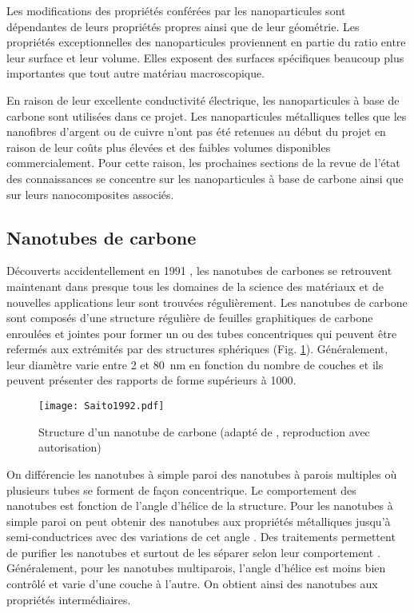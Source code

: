 Les modifications des propriétés conférées par les nanoparticules sont dépendantes de leurs propriétés propres ainsi que de leur géométrie. 
Les propriétés exceptionnelles des nanoparticules proviennent en partie du ratio entre leur surface et leur volume. 
Elles exposent des surfaces spécifiques beaucoup plus importantes que tout autre matériau macroscopique. 

En raison de leur excellente conductivité électrique, les nanoparticules à base de carbone sont utilisées dans ce projet. 
Les nanoparticules métalliques telles que les nanofibres d'argent ou de cuivre n'ont pas été retenues au début du projet en raison de leur coûts plus élevées et des faibles volumes disponibles commercialement. 
Pour cette raison, les prochaines sections de la revue de l'état des connaissances se concentre sur les nanoparticules à base de carbone ainsi que sur leurs nanocomposites associés. 

\subsection{Nanotubes de carbone}

Découverts accidentellement en 1991 \cite{iijima1991}, les nanotubes de carbones se retrouvent maintenant dans presque tous les domaines de la science des matériaux et de nouvelles applications leur sont trouvées régulièrement. 
Les nanotubes de carbone sont composés d'une structure régulière de feuilles graphitiques de carbone enroulées et jointes pour former un ou des tubes concentriques qui peuvent être refermés aux extrémités par des structures sphériques (Fig. \ref{structure_nanotube}). 
Généralement, leur diamètre varie entre 2 et \SI{80}{\nano\metre} en fonction du nombre de couches et ils peuvent présenter des rapports de forme supérieurs à 1000. 

\begin{figure}[htb]
	\centering
	\texttt{[image: Saito1992.pdf]}
	\caption{Structure d'un nanotube de carbone (adapté de \cite{Saito1992}, reproduction avec autorisation)}
	\label{structure_nanotube}
\end{figure}

On différencie les nanotubes à simple paroi des nanotubes à parois multiples où plusieurs tubes se forment de façon concentrique. 
Le comportement des nanotubes est fonction de l'angle d'hélice de la structure. 
Pour les nanotubes à simple paroi on peut obtenir des nanotubes aux propriétés métalliques jusqu'à semi-conductrices avec des variations de cet angle \cite{Saito1992}. 
Des traitements permettent de purifier les nanotubes et surtout de les séparer selon leur comportement \cite{Makama2013}. 
Généralement, pour les nanotubes multiparois, l'angle d'hélice est moins bien contrôlé et varie d'une couche à l'autre.
On obtient ainsi des nanotubes aux propriétés intermédiaires. 


